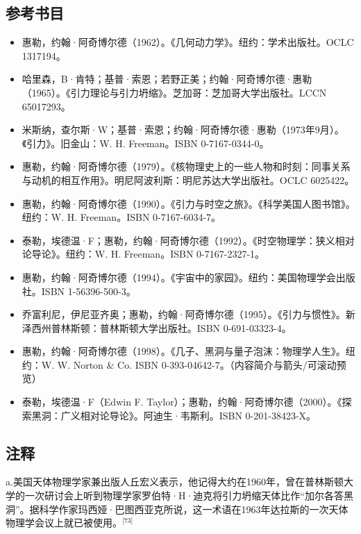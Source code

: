 \subsection{参考书目}
\begin{itemize}
\item 惠勒，约翰·阿奇博尔德（1962）。《几何动力学》。纽约：学术出版社。OCLC 1317194。
\item 哈里森，B·肯特；基普·索恩；若野正美；约翰·阿奇博尔德·惠勒（1965）。《引力理论与引力坍缩》。芝加哥：芝加哥大学出版社。LCCN 65017293。
\item 米斯纳，查尔斯·W；基普·索恩；约翰·阿奇博尔德·惠勒（1973年9月）。《引力》。旧金山：W. H. Freeman。ISBN 0-7167-0344-0。
\item 惠勒，约翰·阿奇博尔德（1979）。《核物理史上的一些人物和时刻：同事关系与动机的相互作用》。明尼阿波利斯：明尼苏达大学出版社。OCLC 6025422。
\item 惠勒，约翰·阿奇博尔德（1990）。《引力与时空之旅》。《科学美国人图书馆》。纽约：W. H. Freeman。ISBN 0-7167-6034-7。
\item 泰勒，埃德温·F；惠勒，约翰·阿奇博尔德（1992）。《时空物理学：狭义相对论导论》。纽约：W. H. Freeman。ISBN 0-7167-2327-1。
\item 惠勒，约翰·阿奇博尔德（1994）。《宇宙中的家园》。纽约：美国物理学会出版社。ISBN 1-56396-500-3。
\item 乔富利尼，伊尼亚齐奥；惠勒，约翰·阿奇博尔德（1995）。《引力与惯性》。新泽西州普林斯顿：普林斯顿大学出版社。ISBN 0-691-03323-4。
\item 惠勒，约翰·阿奇博尔德（1998）。《几子、黑洞与量子泡沫：物理学人生》。纽约：W. W. Norton & Co. ISBN 0-393-04642-7。（内容简介与箭头/可滚动预览）
\item 泰勒，埃德温·F（Edwin F. Taylor）；惠勒，约翰·阿奇博尔德（2000）。《探索黑洞：广义相对论导论》。阿迪生·韦斯利。ISBN 0-201-38423-X。
\end{itemize}
\subsection{注释}

a.美国天体物理学家兼出版人丘宏义表示，他记得大约在1960年，曾在普林斯顿大学的一次研讨会上听到物理学家罗伯特·H·迪克将引力坍缩天体比作“加尔各答黑洞”。据科学作家玛西娅·巴图西亚克所说，这一术语在1963年达拉斯的一次天体物理学会议上就已被使用。\(^\text{[73]}\)
